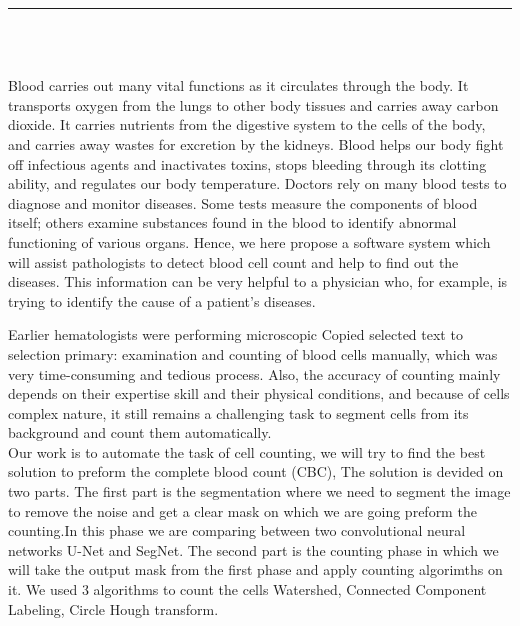 \documentclass[12pt]{report}
\begin{document}

\newpage

\pagestyle{myfancy}

\vspace*{-0.2in}

\setcounter{page}{1}

\begin{center}
    {\color{Black} \rule{6.2in}{1.4mm} }\\
    \vspace{0.1in}
    \scshape{\fontsize{34}{46}{\bfseries{\color{Black}{General Introduction}}}}
    \\
    \vspace{0.5in}
\end{center}
\hspace*{0.16in}

Blood carries out many vital functions as it circulates through the body. It transports oxygen from the lungs to other body tissues and carries away carbon dioxide. It carries nutrients from the digestive system to the cells of the body, and carries away wastes for excretion by the kidneys. Blood helps our body fight off infectious agents and inactivates toxins, stops bleeding through its clotting ability, and regulates our body temperature. Doctors rely on many blood tests to diagnose and monitor diseases. Some tests measure the components of blood itself; others examine substances found in the blood to identify abnormal functioning of various organs. Hence, we here propose a software system which will assist pathologists to detect blood cell count and help to find out the diseases. This information can be very helpful to a physician who, for example, is trying to identify the cause of a patient's diseases.

Earlier hematologists were performing microscopic Copied selected text to selection primary: examination and counting of blood cells manually, which  was very time-consuming and tedious process. Also, the accuracy of counting mainly depends on their expertise skill and their physical conditions, and because of cells complex nature, it still remains a challenging task to segment cells from its background and count them automatically.\\
Our work is to automate the task of cell counting, we will  try to find the best solution to preform the complete blood count (CBC), The solution is devided on two parts.
The first part is the segmentation where we need to segment the image to remove the noise and get a clear mask on which we are going preform the counting.In this phase we are comparing between two convolutional neural networks U-Net and SegNet.
The second part is the counting phase in which we will take  the output mask from the first phase and apply counting algorimths on it. We used 3 algorithms to count the cells Watershed, Connected Component Labeling, Circle Hough transform.
\end{document}
